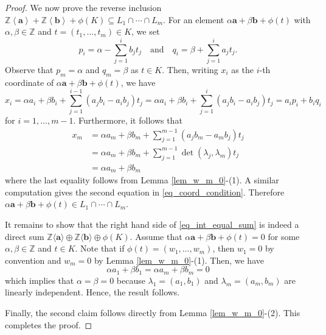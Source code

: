 \documentclass[10pt,a4paper]{amsart}
\newcommand{\ZZ}{\mathbb{Z}}
\begin{document}
\begin{proof}
We now prove the reverse inclusion $\mathbb{Z}\left<\mathbf{a}\right> + \mathbb{Z}\left<\mathbf{b}\right>+ \phi(K)\subseteq L_1\cap \cdots \cap L_m$. For an element $\alpha \mathbf{a} + \beta \mathbf{b} + \phi(t)$ with $\alpha, \beta\in \mathbb{Z}$ and $t=(t_1, \dots, t_m) \in K$, we set 
\[
p_i=\alpha - \sum_{j=1}^i b_jt_j \quad \text{and} \quad q_i=\beta + \sum_{j=1}^i a_jt_j.
\]
Observe that $p_m= \alpha$ and $q_m= \beta$ as $t\in K$.
Then, writing $x_i$ as the $i$-th coordinate of $\alpha \mathbf{a} + \beta \mathbf{b} + \phi(t)$, we have 
\[
x_i = \alpha a_i + \beta b_i + \sum_{j=1}^{i-1}(a_jb_i-a_ib_j)t_j = \alpha a_i + \beta b_i + \sum_{j=1}^{i}(a_jb_i-a_ib_j)t_j  =  a_ip_i+b_iq_i
\]
for $i=1,\dots, m-1$. Furthermore, it follows that 
\begin{equation*}
\begin{split}
x_m& =\alpha a_m + \beta b_m + \sum_{j=1}^{m-1}(a_jb_m-a_mb_j)t_j\\
&= \alpha a_m + \beta b_m + \sum_{j=1}^{m-1} \det (\lambda_j, \lambda_m)t_j  \\
&= \alpha a_m + \beta b_m 
\end{split}
\end{equation*}
where the last equality follows from Lemma \ref{lem_w_m_0}-(1). A similar computation gives the second equation in \eqref{eq_coord_condition}. Therefore
$\alpha \mathbf{a} + \beta \mathbf{b} + \phi(t)\in L_1 \cap \cdots \cap L_m$.

It remains to show that the right hand side of \eqref{eq_int_equal_sum} is indeed a direct sum $\ZZ\langle\textbf{a}\rangle\oplus\ZZ\langle\textbf{b}\rangle\oplus\phi(K)$. 
Assume that $\alpha \mathbf{a} + \beta \mathbf{b} + \phi(t)=0$ for some $\alpha, \beta\in \ZZ$ and $t\in K$. Note that if $\phi(t)=(w_1, \dots, w_m)$, then $w_1=0$ by convention and $w_m=0$ by Lemma \ref{lem_w_m_0}-(1). Then, we have 
\[
\alpha a_1+ \beta b_1 = \alpha a_m + \beta b_m = 0
\]
which implies that $\alpha=\beta=0$ because $\lambda_1=(a_1, b_1)$ and $\lambda_m=(a_m, b_m)$ are linearly independent. Hence, the result follows. 


Finally, the second claim follows directly from Lemma \ref{lem_w_m_0}-(2). This completes the proof.
\end{proof}
\end{document}
